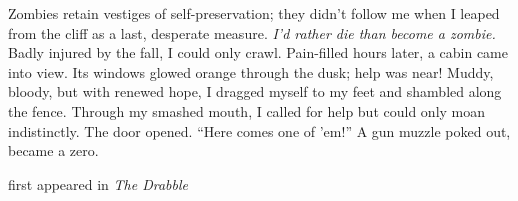 Zombies retain vestiges of self-preservation; they didn't follow me when
I leaped from the cliff as a last, desperate measure. \emph{I'd rather
die than become a zombie.} Badly injured by the fall, I could only
crawl. Pain-filled hours later, a cabin came into view. Its windows
glowed orange through the dusk; help was near! Muddy, bloody, but with
renewed hope, I dragged myself to my feet and shambled along the fence.
Through my smashed mouth, I called for help but could only moan
indistinctly. The door opened. ``Here comes one of 'em!'' A gun muzzle
poked out, became a zero.

first appeared in \emph{The Drabble}
